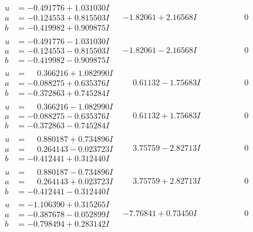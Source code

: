 \documentclass[1p]{elsarticle_modified}
\theoremstyle{definition}
\begin{document}
$$\begin{array}{c|c|c}
\begin{aligned}
u &= -0.491776 + 1.031030 I \\
a &= -0.124553 + 0.815503 I \\
b &= -0.419982 + 0.909875 I\end{aligned}
 & -1.82061 + 2.16568 I & \phantom{-0.000000 } 0 \\ \hline\begin{aligned}
u &= -0.491776 - 1.031030 I \\
a &= -0.124553 - 0.815503 I \\
b &= -0.419982 - 0.909875 I\end{aligned}
 & -1.82061 - 2.16568 I & \phantom{-0.000000 } 0 \\ \hline\begin{aligned}
u &= \phantom{-}0.366216 + 1.082990 I \\
a &= -0.088275 + 0.635376 I \\
b &= -0.372863 + 0.745284 I\end{aligned}
 & \phantom{-}0.61132 - 1.75683 I & \phantom{-0.000000 } 0 \\ \hline\begin{aligned}
u &= \phantom{-}0.366216 - 1.082990 I \\
a &= -0.088275 - 0.635376 I \\
b &= -0.372863 - 0.745284 I\end{aligned}
 & \phantom{-}0.61132 + 1.75683 I & \phantom{-0.000000 } 0 \\ \hline\begin{aligned}
u &= \phantom{-}0.880187 + 0.734896 I \\
a &= \phantom{-}0.264143 - 0.023723 I \\
b &= -0.412441 + 0.312440 I\end{aligned}
 & \phantom{-}3.75759 - 2.82713 I & \phantom{-0.000000 } 0 \\ \hline\begin{aligned}
u &= \phantom{-}0.880187 - 0.734896 I \\
a &= \phantom{-}0.264143 + 0.023723 I \\
b &= -0.412441 - 0.312440 I\end{aligned}
 & \phantom{-}3.75759 + 2.82713 I & \phantom{-0.000000 } 0 \\ \hline\begin{aligned}
u &= -1.106390 + 0.315265 I \\
a &= -0.387678 - 0.052899 I \\
b &= -0.798494 + 0.283142 I\end{aligned}
 & -7.76841 + 0.73450 I & \phantom{-0.000000 } 0 \\ \hline\begin{aligned}

\end{aligned}
\end{array}$$
\end{document}
